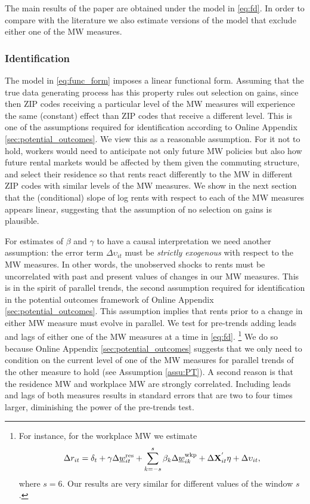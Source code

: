 The main results of the paper are obtained under the model in \eqref{eq:fd}. 
In order to compare with the literature we also estimate versions of the 
model that exclude either one of the MW measures.

\subsubsection*{Identification}

The model in \eqref{eq:func_form} imposes a linear functional form.
Assuming that the true data generating process has this property rules out 
selection on gains, since then ZIP codes receiving a particular level of the
MW measures will experience the same (constant) effect than ZIP codes that 
receive a different level.
This is one of the assumptions required for identification according to 
Online Appendix \ref{sec:potential_outcomes}.
We view this as a reasonable assumption.
For it not to hold, workers would need to anticipate not only future MW policies 
but also how future rental markets would be affected by them given the commuting 
structure, and select their residence so that rents react differently to the 
MW in different ZIP codes with similar levels of the MW measures.
We show in the next section that the (conditional) slope of log rents with 
respect to each of the MW measures appears linear, suggesting that the 
assumption of no selection on gains is plausible.

For estimates of $\beta$ and $\gamma$ to have a causal interpretation we need 
another assumption: the error term $\Delta\upsilon_{it}$ must be 
\textit{strictly exogenous} with respect to the MW measures.
In other words, the unobserved shocks to rents must be uncorrelated with past 
and present values of changes in our MW measures.
This is in the spirit of parallel trends, the second assumption required for
identification in the potential outcomes framework of Online Appendix 
\ref{sec:potential_outcomes}.
This assumption implies that rents prior to a change in either MW measure must
evolve in parallel.
We test for pre-trends adding leads and lags of either one of the MW measures 
at a time in \eqref{eq:fd}.%
\footnote{For instance, for the workplace MW we estimate
\begin{equation*}
    \Delta r_{it} = \delta_t
                  + \gamma \Delta \underline{w}^{\text{res}}_{it} 
                  + \sum_{k=-s}^{s} \beta_k \Delta \underline{w}^{\text{wkp}}_{ik}
                  + \Delta \mathbf{X}^{'}_{it}\eta
                  + \Delta \upsilon_{it} ,
\end{equation*}
where $s=6$.
Our results are very similar for different values of the window $s$.}
We do so because Online Appendix \ref{sec:potential_outcomes} suggests that we 
only need to condition on the current level of one of the MW measures for 
parallel trends of the other measure to hold (see Assumption \ref{assu:PT}).
A second reason is that the residence MW and workplace MW are strongly 
correlated.
Including leads and lags of both measures results in standard errors that are
two to four times larger, diminishing the power of the pre-trends test.

